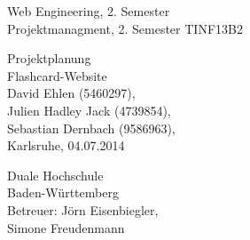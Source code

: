 \documentclass{article}
\newcommand{\appname}{Flashcard-Website}
\begin{document}
\begin{titlepage}
    \large
    \begin{flushleft}
        Web Engineering, 2. Semester \\
        Projektmanagment, 2. Semester
        TINF13B2
    \end{flushleft}
    
    \vfill

    \begin{center}
        \Huge Projektplanung\\
        \Large \appname \\
        \vspace{1cm}
        \normalsize David Ehlen (5460297),\\
        Julien Hadley Jack (4739854), \\
        Sebastian Dernbach (9586963), \\
        \vspace\medskipamount
        \vspace\medskipamount
        Karlsruhe, 04.07.2014
    \end{center}
    
    \vfill
    
    \begin{flushright}
        Duale Hochschule \\
        Baden-Württemberg \\
        \vspace\medskipamount
        Betreuer: Jörn Eisenbiegler,\\
        Simone Freudenmann
    \end{flushright}
\end{titlepage}

\newpage

\pagestyle{empty}
\tableofcontents
\cleardoublepage

\setcounter{page}{1}
\pagestyle{plain}













%
%
%

%
%
%
%
%
%
%
\end{document}
